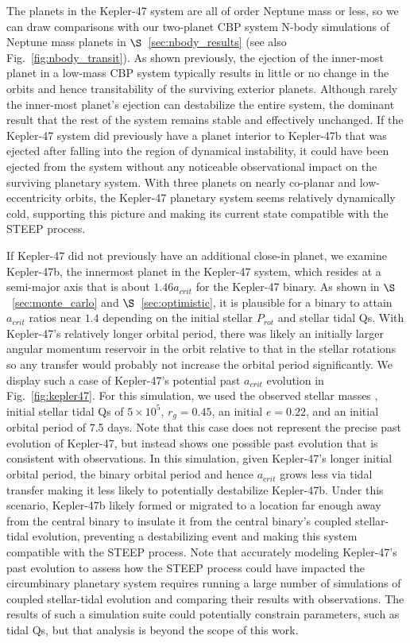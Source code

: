 The planets in the Kepler-47 system are all of order Neptune mass or less, so we can draw comparisons with our two-planet CBP system N-body simulations of Neptune mass planets in $\S$~\ref{sec:nbody_results} (see also Fig.~\ref{fig:nbody_transit}).  As shown previously, the ejection of the inner-most planet in a low-mass CBP system typically results in little or no change in the orbits and hence transitability of the surviving exterior planets.  Although rarely the inner-most planet's ejection can destabilize the entire system, the dominant result that the rest of the system remains stable and effectively unchanged.  If the Kepler-47 system did previously have a planet interior to Kepler-47b that was ejected after falling into the region of dynamical instability, it could have been ejected from the system without any noticeable observational impact on the surviving planetary system.  With three planets on nearly co-planar and low-eccentricity orbits, the Kepler-47 planetary system seems relatively dynamically cold, supporting this picture and making its current state compatible with the STEEP process.

If Kepler-47 did not previously have an additional close-in planet, we examine Kepler-47b, the innermost planet in the Kepler-47 system, which resides at a semi-major axis that is about $1.46 a_{crit}$ for the Kepler-47 binary.  As shown in $\S$~\ref{sec:monte_carlo} and $\S$~\ref{sec:optimistic}, it is plausible for a binary to attain $a_{crit}$ ratios near $1.4$ depending on the initial stellar $P_{rot}$ and stellar tidal Qs.  With Kepler-47's relatively longer orbital period, there was likely an initially larger angular momentum reservoir in the orbit relative to that in the stellar rotations so any transfer would probably not increase the orbital period significantly.  We display such a case of Kepler-47's potential past $a_{crit}$ evolution in Fig.~\ref{fig:kepler47}.  For this simulation, we used the observed stellar masses \citep{Orosz2012}, initial stellar tidal Qs of $5 \times 10^5$, $r_g = 0.45$, an initial $e = 0.22$, and an initial orbital period of 7.5 days.  Note that this case does not represent the precise past evolution of Kepler-47, but instead shows one possible past evolution that is consistent with observations.  In this simulation, given Kepler-47's longer initial orbital period, the binary orbital period and hence $a_{crit}$ grows less via tidal transfer making it less likely to potentially destabilize Kepler-47b.  Under this scenario, Kepler-47b likely formed or migrated to a location far enough away from the central binary to insulate it from the central binary's coupled stellar-tidal evolution, preventing a destabilizing event and making this system compatible with the STEEP process.  Note that accurately modeling Kepler-47's past evolution to assess how the STEEP process could have impacted the circumbinary planetary system requires running a large number of simulations of coupled stellar-tidal evolution and comparing their results with observations.  The results of such a simulation suite could potentially constrain parameters, such as tidal Qs, but that analysis is beyond the scope of this work.

